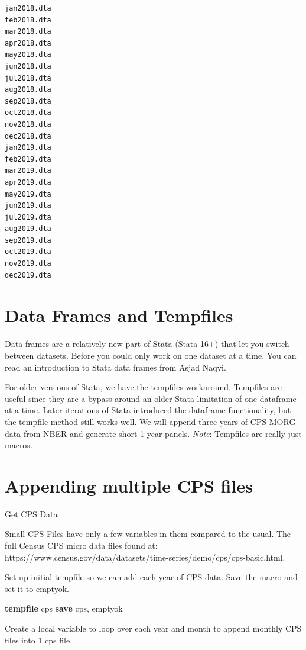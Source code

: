 \documentclass[
]{book}
\newenvironment{Shaded}{\begin{snugshade}}{\end{snugshade}}
\newcommand{\KeywordTok}[1]{\textcolor[rgb]{0.13,0.29,0.53}{\textbf{#1}}}
\newcommand{\NormalTok}[1]{#1}
\newcommand{\OtherTok}[1]{\textcolor[rgb]{0.56,0.35,0.01}{#1}}
\begin{document}
\begin{verbatim}
jan2018.dta
feb2018.dta
mar2018.dta
apr2018.dta
may2018.dta
jun2018.dta
jul2018.dta
aug2018.dta
sep2018.dta
oct2018.dta
nov2018.dta
dec2018.dta
jan2019.dta
feb2019.dta
mar2019.dta
apr2019.dta
may2019.dta
jun2019.dta
jul2019.dta
aug2019.dta
sep2019.dta
oct2019.dta
nov2019.dta
dec2019.dta
\end{verbatim}

\section{Data Frames and Tempfiles}\label{data-frames-and-tempfiles}

Data frames are a relatively new part of Stata (Stata 16+) that let you switch between datasets. Before you could only work on one dataset at a time. You can read an introduction to Stata data frames from
Asjad Naqvi.

For older versions of Stata, we have the tempfiles workaround. Tempfiles are useful since they are a bypass around an older Stata limitation of one dataframe at a time. Later iterations of Stata introduced the dataframe functionality, but the tempfile method still works well.
We will append three years of CPS MORG data from NBER and generate short 1-year panels. \emph{Note}: Tempfiles are really just macros.

\section{Appending multiple CPS files}\label{appending-multiple-cps-files}

Get CPS Data

Small CPS Files have only a few variables in them compared to the usual.
The full Census CPS micro data files found at:
https://www.census.gov/data/datasets/time-series/demo/cps/cps-basic.html.

Set up initial tempfile so we can add each year of CPS data. Save the macro and set it to emptyok.

\begin{Shaded}
\begin{Highlighting}[]
\KeywordTok{tempfile}\NormalTok{ cps}
\KeywordTok{save} \OtherTok{\textasciigrave{}cps\textquotesingle{}}\NormalTok{, emptyok}
\end{Highlighting}
\end{Shaded}

Create a local variable to loop over each year and month to append monthly CPS files into 1 cps file.
\end{document}
